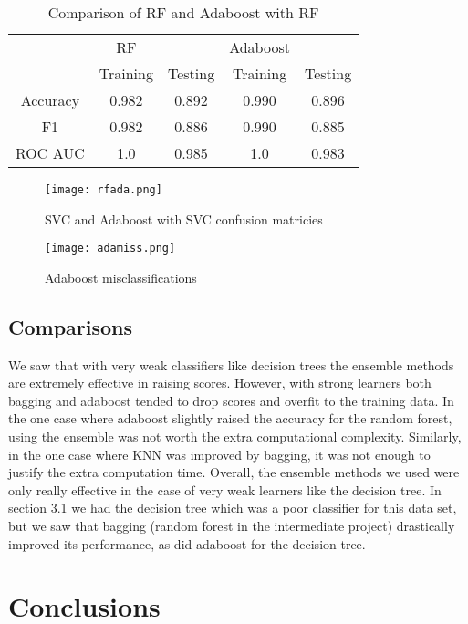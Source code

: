 \documentclass[12pt]{article}
\begin{document}
\begin{table}[h!]
	\centering
	\begin{tabular}{| c|cc|cc|} 
		\hline
		&RF&&Adaboost&\\
		& Training & Testing& Training & Testing\\ \hline
		Accuracy & 0.982& 0.892 & 0.990 &0.896 \\ 
		F1  &  0.982 &0.886&  0.990 &0.885\\ 
		ROC AUC & 1.0 & 0.985 & 1.0 &0.983\\
		\hline
	\end{tabular}
	\caption{Comparison of RF and Adaboost with RF}
	\label{table: 15}
\end{table}

\begin{figure}[h]
	\centering
	\texttt{[image: rfada.png]}
	\caption{SVC and Adaboost with SVC confusion matricies}
	\label{rfconfada}
\end{figure}

\begin{figure}[h]
	\centering
	\texttt{[image: adamiss.png]}
	\caption{Adaboost misclassifications}
	\label{adamiss}
\end{figure}
\FloatBarrier

\subsection{Comparisons}

We saw that with very weak classifiers like decision trees the ensemble methods are extremely effective in raising scores. However, with strong learners both bagging and adaboost tended to drop scores and overfit to the training data. In the one case where adaboost slightly raised the accuracy for the random forest, using the ensemble was not worth the extra computational complexity. Similarly, in the one case where KNN was improved by bagging, it was not enough to justify the extra computation time. Overall, the ensemble methods we used were only really effective in the case of very weak learners like the decision tree. In section 3.1 we had the decision tree which was a poor classifier for this data set, but we saw that bagging (random forest in the intermediate project) drastically improved its performance, as did adaboost for the decision tree.

\section{Conclusions}
\end{document}
